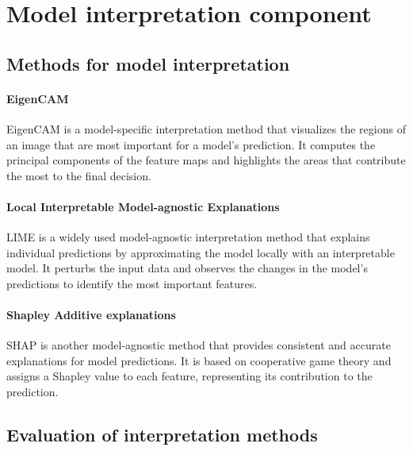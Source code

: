 


\section{Model interpretation component}\label{sec:model-interpretation2}

\subsection{Methods for model interpretation}\label{subsec:methods-for-model-interpretation}

\paragraph{EigenCAM}\label{par:eigencam}
EigenCAM is a model-specific interpretation method that visualizes the regions of an image that are most
important for a model's prediction.
It computes the principal components of the feature maps and highlights the areas that contribute the most
to the final decision.

\paragraph{Local Interpretable Model-agnostic Explanations}\label{par:lime}
LIME is a widely used model-agnostic interpretation method that explains individual predictions by
approximating the model locally with an interpretable model.
It perturbs the input data and observes the changes in the model's predictions to identify the most
important features.

\paragraph{Shapley Additive explanations}\label{par:shap}
SHAP is another model-agnostic method that provides consistent and accurate explanations for model predictions.
It is based on cooperative game theory and assigns a Shapley value to each feature,
representing its contribution to the prediction.

\subsection{Evaluation of interpretation methods}\label{subsec:evaluation-of-interpretation-methods}

